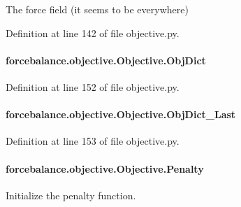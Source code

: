 The force field (it seems to be everywhere) 



Definition at line 142 of file objective.\-py.

\hypertarget{classforcebalance_1_1objective_1_1Objective_aee0b6ceda10120047e9ebe6f20c1f8a0}{
\paragraph[{Obj\-Dict}]{\setlength{\rightskip}{0pt plus 5cm}forcebalance.\-objective.\-Objective.\-Obj\-Dict}}\label{classforcebalance_1_1objective_1_1Objective_aee0b6ceda10120047e9ebe6f20c1f8a0}


Definition at line 152 of file objective.\-py.

\hypertarget{classforcebalance_1_1objective_1_1Objective_a86263748baa5017d4dc1c3a824d7382e}{
\paragraph[{Obj\-Dict\-\_\-\-Last}]{\setlength{\rightskip}{0pt plus 5cm}forcebalance.\-objective.\-Objective.\-Obj\-Dict\-\_\-\-Last}}\label{classforcebalance_1_1objective_1_1Objective_a86263748baa5017d4dc1c3a824d7382e}


Definition at line 153 of file objective.\-py.

\hypertarget{classforcebalance_1_1objective_1_1Objective_aafb2228e87f0e3647b2e4be0678d76ba}{
\paragraph[{Penalty}]{\setlength{\rightskip}{0pt plus 5cm}forcebalance.\-objective.\-Objective.\-Penalty}}\label{classforcebalance_1_1objective_1_1Objective_aafb2228e87f0e3647b2e4be0678d76ba}


Initialize the penalty function. 



